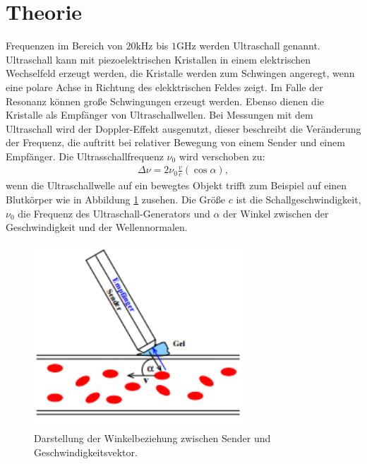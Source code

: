 \section{Theorie}
\label{sec:Theorie}
Frequenzen im Bereich von $20 \si{\kilo\hertz}$ bis $1 \si{\giga\hertz}$ werden Ultraschall genannt.
Ultraschall kann mit piezoelektrischen Kristallen in einem elektrischen Wechselfeld erzeugt werden, die
Kristalle werden zum Schwingen angeregt, wenn eine polare Achse in Richtung des elekktrischen Feldes zeigt.
Im Falle der Resonanz können große Schwingungen erzeugt werden. Ebenso dienen die Kristalle als Empfänger von Ultraschallwellen.
Bei Messungen mit dem Ultraschall wird der Doppler-Effekt ausgenutzt, dieser beschreibt die Veränderung der
Frequenz, die auftritt bei relativer Bewegung von einem Sender und einem Empfänger.
Die Ultrasschallfrequenz $\nu_0$ wird verschoben zu:
\begin{align}
 \Delta \nu =2\nu_0 \frac{v}{c}(\cos{\alpha}),\label{eqn:deltav}
\end{align}
wenn die Ultraschallwelle auf ein bewegtes Objekt trifft zum Beispiel auf einen Blutkörper wie in Abbildung \ref{fig:1} zusehen.
Die Größe $c$ ist die Schallgeschwindigkeit, $\nu_0$ die Frequenz des Ultraschall-Generators und $\alpha$ der Winkel
zwischen der Geschwindigkeit und der Wellennormalen.
\begin{figure}
  \includegraphics[width=0.7\textwidth]{Unbenannt1.png}
  \centering
  \caption{Darstellung der Winkelbeziehung zwischen Sender und Geschwindigkeitsvektor.\cite{sample} }
  \label{fig:1}
\end{figure}

